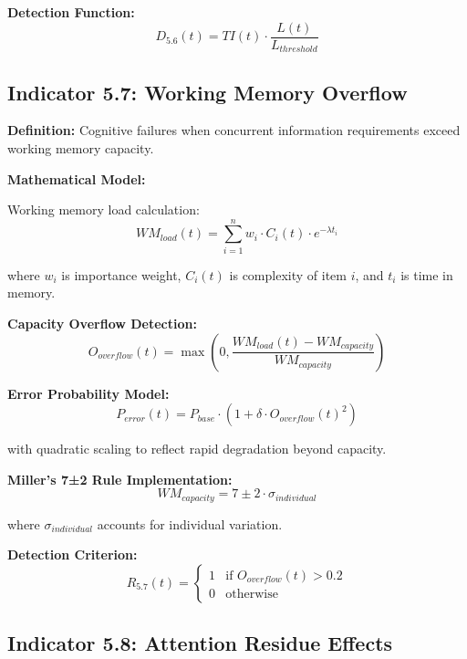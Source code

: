 \documentclass[11pt,a4paper]{article}
\begin{document}
\textbf{Detection Function:}
\begin{equation}
D_{5.6}(t) = TI(t) \cdot \frac{L(t)}{L_{threshold}}
\end{equation}

\subsection{Indicator 5.7: Working Memory Overflow}

\textbf{Definition:} Cognitive failures when concurrent information requirements exceed working memory capacity.

\textbf{Mathematical Model:}

Working memory load calculation:
\begin{equation}
WM_{load}(t) = \sum_{i=1}^{n} w_i \cdot C_i(t) \cdot e^{-\lambda t_i}
\end{equation}

where $w_i$ is importance weight, $C_i(t)$ is complexity of item $i$, and $t_i$ is time in memory.

\textbf{Capacity Overflow Detection:}
\begin{equation}
O_{overflow}(t) = \max\left(0, \frac{WM_{load}(t) - WM_{capacity}}{WM_{capacity}}\right)
\end{equation}

\textbf{Error Probability Model:}
\begin{equation}
P_{error}(t) = P_{base} \cdot \left(1 + \delta \cdot O_{overflow}(t)^2\right)
\end{equation}

with quadratic scaling to reflect rapid degradation beyond capacity.

\textbf{Miller's 7±2 Rule Implementation:}
\begin{equation}
WM_{capacity} = 7 \pm 2 \cdot \sigma_{individual}
\end{equation}

where $\sigma_{individual}$ accounts for individual variation.

\textbf{Detection Criterion:}
\begin{equation}
R_{5.7}(t) = \begin{cases}
1 & \text{if } O_{overflow}(t) > 0.2 \\
0 & \text{otherwise}
\end{cases}
\end{equation}

\subsection{Indicator 5.8: Attention Residue Effects}
\end{document}
